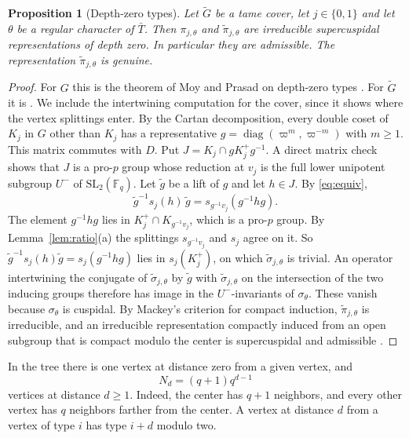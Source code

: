 \documentclass[12pt,letterpaper]{article}
\numberwithin{equation}{section}
\newtheorem{proposition}[theorem]{Proposition}
\theoremstyle{definition}
\theoremstyle{remark}
\newcommand{\kk}{\mathbb F_q}
\newcommand{\Gt}{\widetilde G}
\newcommand{\diag}{\operatorname{diag}}
\begin{document}
\begin{proposition}[Depth-zero types]\label{prop:types}
Let $\Gt$ be a tame cover, let $j\in\{0,1\}$ and let $\theta$ be a regular character of $\bar T$. Then $\pi_{j,\theta}$ and $\widetilde\pi_{j,\theta}$ are irreducible supercuspidal representations of depth zero. In particular they are admissible. The representation $\widetilde\pi_{j,\theta}$ is genuine.
\end{proposition}
\begin{proof}
For $G$ this is the theorem of Moy and Prasad on depth-zero types \cite{MP94,MP96}. For $\Gt$ it is \cite[Thm.~3.5]{HW09}. We include the intertwining computation for the cover, since it shows where the vertex splittings enter. By the Cartan decomposition, every double coset of $K_j$ in $G$ other than $K_j$ has a representative $g=\diag(\varpi^m,\varpi^{-m})$ with $m\ge1$. This matrix commutes with $D$. Put $J=K_j\cap gK_j^+g^{-1}$. A direct matrix check shows that $J$ is a pro-$p$ group whose reduction at $v_j$ is the full lower unipotent subgroup $U^-$ of $\mathrm{SL}_2(\kk)$. Let $\widetilde g$ be a lift of $g$ and let $h\in J$. By \eqref{eq:equiv},
\[
 \widetilde g^{-1}s_j(h)\,\widetilde g=s_{g^{-1}v_j}(g^{-1}hg).
\]
The element $g^{-1}hg$ lies in $K_j^+\cap K_{g^{-1}v_j}$, which is a pro-$p$ group. By Lemma~\ref{lem:ratio}(a) the splittings $s_{g^{-1}v_j}$ and $s_j$ agree on it. So $\widetilde g^{-1}s_j(h)\widetilde g=s_j(g^{-1}hg)$ lies in $s_j(K_j^+)$, on which $\widetilde\sigma_{j,\theta}$ is trivial. An operator intertwining the conjugate of $\widetilde\sigma_{j,\theta}$ by $\widetilde g$ with $\widetilde\sigma_{j,\theta}$ on the intersection of the two inducing groups therefore has image in the $U^-$-invariants of $\sigma_\theta$. These vanish because $\sigma_\theta$ is cuspidal. By Mackey's criterion for compact induction, $\widetilde\pi_{j,\theta}$ is irreducible, and an irreducible representation compactly induced from an open subgroup that is compact modulo the center is supercuspidal and admissible \cite[\S11.4]{BH06}.
\end{proof}

In the tree there is one vertex at distance zero from a given vertex, and
\begin{equation}\label{eq:sphere}
 N_d=(q+1)q^{d-1}
\end{equation}
vertices at distance $d\ge1$. Indeed, the center has $q+1$ neighbors, and every other vertex has $q$ neighbors farther from the center. A vertex at distance $d$ from a vertex of type $i$ has type $i+d$ modulo two.
\end{document}
